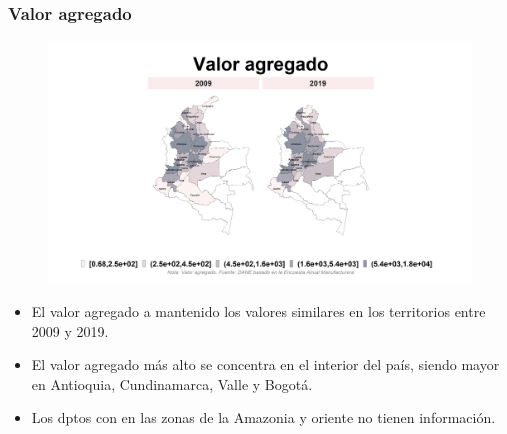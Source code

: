         \subsubsection{Valor agregado}

    \begin{figure}[H]
        \caption[Valor agregado por departamentos (mapa) - 2009 VS 2019 ]{\label{valor_agreg_dptos_mapa} }
        \begin{center}
        \includegraphics[width=\textwidth,keepaspectratio]{img/var_226_map.png}
        \end{center}
    \end{figure}
            \begin{itemize}
                    \item El valor agregado a mantenido los valores similares en los territorios entre 2009 y 2019.
                    \item El valor agregado más alto se concentra en el interior del país, siendo mayor en Antioquia, Cundinamarca, Valle y Bogotá.
                    \item Los dptos con en las zonas de la Amazonia y oriente no tienen información.
                    \end{itemize}

